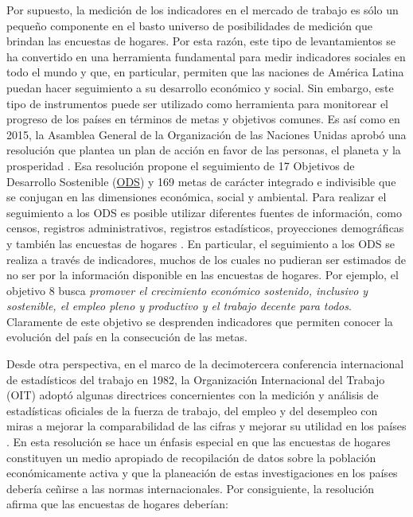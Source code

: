Por supuesto, la medición de los indicadores en el mercado de trabajo es sólo un pequeño componente en el basto universo de posibilidades de medición que brindan las encuestas de hogares. Por esta razón, este tipo de levantamientos se ha convertido en una herramienta fundamental para medir indicadores sociales en todo el mundo y que, en particular, permiten que las naciones de América Latina puedan hacer seguimiento a su desarrollo económico y social. Sin embargo, este tipo de instrumentos puede ser utilizado como herramienta para monitorear el progreso de los países en términos de metas y objetivos comunes. Es así como en 2015, la Asamblea General de la Organización de las Naciones Unidas aprobó una resolución que plantea un plan de acción en favor de las personas, el planeta y la prosperidad \citep{United_Nations_2015}. Esa resolución propone el seguimiento de 17 Objetivos de Desarrollo Sostenible (\href{https://sustainabledevelopment.un.org}{ODS}) y 169 metas de carácter integrado e indivisible que se conjugan en las dimensiones económica, social y ambiental. Para realizar el seguimiento a los ODS es posible utilizar diferentes fuentes de información, como censos, registros administrativos, registros estadísticos, proyecciones demográficas y también las encuestas de hogares \citep{United_Nations_2016}. En particular, el seguimiento a los ODS se realiza a través de indicadores, muchos de los cuales no pudieran ser estimados de no ser por la información disponible en las encuestas de hogares. Por ejemplo, el objetivo 8 busca \emph{promover el crecimiento económico sostenido, inclusivo y sostenible, el empleo pleno y productivo y el trabajo decente para todos}. Claramente de este objetivo se desprenden indicadores que permiten conocer la evolución del país en la consecución de las metas.

Desde otra perspectiva, en el marco de la decimotercera conferencia internacional de estadísticos del trabajo en 1982, la Organización Internacional del Trabajo (OIT) adoptó algunas directrices concernientes con la medición y análisis de estadísticas oficiales de la fuerza de trabajo, del empleo y del desempleo con miras a mejorar la comparabilidad de las cifras y mejorar su utilidad en los países \citep{OIT_1982}. En esta resolución se hace un énfasis especial en que las encuestas de hogares constituyen un medio apropiado de recopilación de datos sobre la población económicamente activa y que la planeación de estas investigaciones en los países debería ceñirse a las normas internacionales. Por consiguiente, la resolución afirma que las encuestas de hogares deberían:

